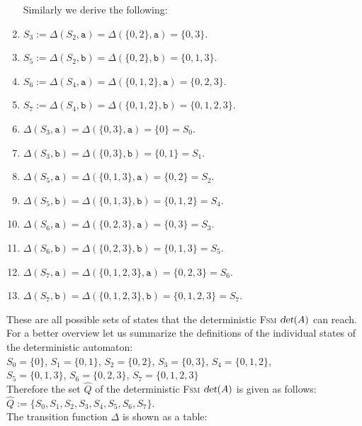 \begin{enumerate}
      Similarly we derive the following:
\item $S_3 := \Delta(S_2, \texttt{a}) = \Delta(\{ 0, 2 \}, \texttt{a}) = \{0, 3 \}$.
\item $S_5 := \Delta(S_2, \texttt{b}) = \Delta(\{ 0, 2 \}, \texttt{b}) = \{0, 1, 3 \}$.
\item $S_6 := \Delta(S_4, \texttt{a}) = \Delta(\{ 0, 1, 2 \}, \texttt{a}) = \{0, 2, 3 \}$.
\item $S_7 := \Delta(S_4, \texttt{b}) = \Delta(\{ 0, 1, 2 \}, \texttt{b}) = \{0, 1, 2, 3 \}$.
\item $\Delta(S_3, \texttt{a}) = \Delta(\{ 0, 3 \}, \texttt{a}) = \{0 \} = S_0$.
\item $\Delta(S_3, \texttt{b}) = \Delta(\{ 0, 3 \}, \texttt{b}) = \{ 0, 1 \} = S_1$.
\item $\Delta(S_5, \texttt{a}) = \Delta(\{ 0, 1, 3 \}, \texttt{a}) = \{ 0, 2 \} = S_2$.
\item $\Delta(S_5, \texttt{b}) = \Delta(\{ 0, 1, 3 \}, \texttt{b}) = \{ 0, 1, 2 \} = S_4$.
\item $\Delta(S_6, \texttt{a}) = \Delta(\{ 0, 2, 3 \}, \texttt{a}) = \{ 0, 3 \} = S_3$.
\item $\Delta(S_6, \texttt{b}) = \Delta(\{ 0, 2, 3 \}, \texttt{b}) = \{ 0, 1, 3 \} = S_5$.
\item $\Delta(S_7, \texttt{a}) = \Delta(\{ 0, 1, 2, 3 \}, \texttt{a}) = \{ 0, 2, 3 \} = S_6$.
\item $\Delta(S_7, \texttt{b}) = \Delta(\{ 0, 1, 2, 3 \}, \texttt{b}) = \{ 0, 1, 2, 3 \} = S_7$.
\end{enumerate}
These are all possible sets of states that the deterministic \textsc{Fsm} $\textsl{det}(A)$ can reach.
For a better overview let us summarize the definitions of the individual states of the deterministic automaton:
\\[0.2cm]
\hspace*{1.3cm} $S_0 = \{ 0 \}$, $S_1 = \{ 0, 1 \}$, $S_2 = \{ 0, 2 \}$, $S_3 = \{ 0, 3 \}$, $S_4 = \{ 0, 1, 2 \}$, 
\\[0.2cm]
\hspace*{1.3cm} $S_5 = \{ 0, 1, 3 \}$, $S_6 = \{ 0, 2, 3 \}$, $S_7 = \{ 0, 1, 2, 3 \}$
\\[0.2cm]
Therefore the set $\widehat{Q}$ of the deterministic \textsc{Fsm} $\textsl{det}(A)$ is given as follows:
\\[0.2cm]
\hspace*{1.3cm}
$\widehat{Q} := \{ S_0, S_1, S_2, S_3, S_4, S_5, S_6, S_7 \}$.
\\[0.2cm]
The transition function $\Delta$ is shown as a table:

